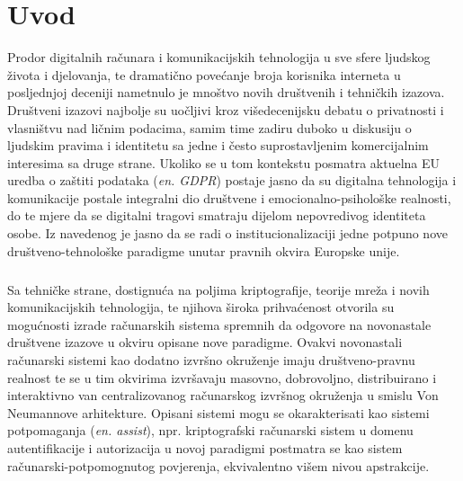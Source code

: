\chapter{Uvod} \label{chapter:intro}
Prodor digitalnih računara i komunikacijskih tehnologija u sve sfere ljudskog života i djelovanja, te dramatično povećanje broja korisnika interneta u posljednjoj deceniji nametnulo je mnoštvo novih društvenih i tehničkih izazova. Društveni izazovi najbolje su uočljivi kroz višedecenijsku debatu o privatnosti i vlasništvu nad ličnim podacima, samim time zadiru duboko u diskusiju o ljudskim pravima i identitetu sa jedne i često suprostavljenim komercijalnim interesima sa druge strane. Ukoliko se u tom kontekstu posmatra aktuelna EU uredba o zaštiti podataka\cite{gdpr} (\textit{en. GDPR}) postaje jasno da su digitalna tehnologija i komunikacije postale integralni dio društvene i emocionalno-psihološke realnosti\cite{Searle1995}, do te mjere da se digitalni tragovi smatraju dijelom nepovredivog identiteta osobe. Iz navedenog je jasno da se radi o institucionalizaciji jedne potpuno nove društveno-tehnološke paradigme unutar pravnih okvira Europske unije.

\paragraph*{}
Sa tehničke strane, dostignuća na poljima kriptografije, teorije mreža i novih komunikacijskih tehnologija, te njihova široka prihvaćenost otvorila su mogućnosti izrade računarskih sistema spremnih da odgovore na novonastale društvene izazove u okviru opisane nove paradigme. Ovakvi novonastali računarski sistemi kao dodatno izvršno okruženje imaju društveno-pravnu realnost te se u tim okvirima izvršavaju masovno, dobrovoljno, distribuirano i interaktivno\cite{Cahill2003} van centralizovanog računarskog izvršnog okruženja u smislu Von Neumannove arhitekture. Opisani sistemi mogu se okarakterisati kao sistemi potpomaganja (\textit{en. assist}), npr. kriptografski računarski sistem u domenu autentifikacije i autorizacija u novoj paradigmi postmatra se kao sistem računarski-potpomognutog povjerenja, ekvivalentno višem nivou apstrakcije.

